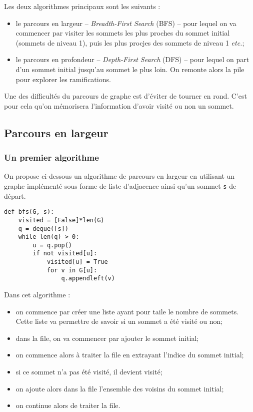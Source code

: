 Les deux algorithmes principaux sont les suivants :
\begin{itemize}
\item le parcours en largeur -- \textit{Breadth-First Search} (BFS) -- pour lequel on va commencer par visiter les sommets les plus proches du sommet initial (sommets de niveau 1), puis les plus procjes des sommets de niveau 1 \textit{etc.};
\item le parcours en profondeur  -- \textit{Depth-First Search} (DFS) -- pour lequel on part d'un sommet initial jusqu'au sommet le plus loin. On remonte alors la pile pour explorer les ramifications.
\end{itemize}

Une des difficultés du parcours de graphe est d'éviter de tourner en rond. C'est pour cela qu'on mémorisera l'information d'avoir visité ou non un sommet. 

\subsection{Parcours en largeur}

\subsubsection{Un premier algorithme}
On propose ci-dessous un algorithme de parcours en largeur en utilisant un graphe implémenté sous forme de liste d'adjacence ainsi qu'un sommet \texttt{s} de départ. 

\begin{lstlisting}
def bfs(G, s):
    visited = [False]*len(G)
    q = deque([s])
    while len(q) > 0:
        u = q.pop()
        if not visited[u]:
            visited[u] = True
            for v in G[u]:
                q.appendleft(v)
\end{lstlisting}

Dans cet algorithme : 
\begin{itemize}
\item on commence par créer une liste ayant pour taile le nombre de sommets. Cette liste va permettre de savoir si un sommet a été visité ou non;
\item dans la file, on va commencer par ajouter le sommet initial;
\item on commence alors à traiter la file en extrayant l'indice du sommet initial;
\item si ce sommet n'a pas été visité, il devient visité;
\item on ajoute alors dans la file l'ensemble des voisins du sommet initial;
\item on continue alors de traiter la file. 
\end{itemize}

